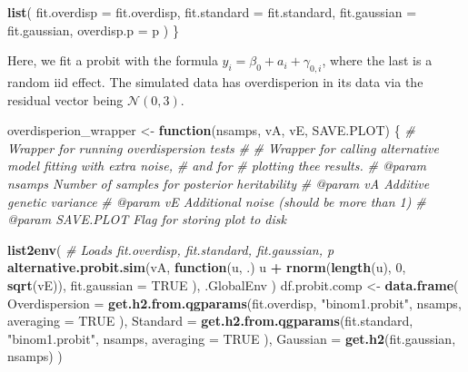 \documentclass[
]{article}
\newenvironment{Shaded}{\begin{snugshade}}{\end{snugshade}}
\newcommand{\AttributeTok}[1]{\textcolor[rgb]{0.13,0.29,0.53}{#1}}
\newcommand{\CommentTok}[1]{\textcolor[rgb]{0.56,0.35,0.01}{\textit{#1}}}
\newcommand{\ConstantTok}[1]{\textcolor[rgb]{0.56,0.35,0.01}{#1}}
\newcommand{\ControlFlowTok}[1]{\textcolor[rgb]{0.13,0.29,0.53}{\textbf{#1}}}
\newcommand{\DecValTok}[1]{\textcolor[rgb]{0.00,0.00,0.81}{#1}}
\newcommand{\FunctionTok}[1]{\textcolor[rgb]{0.13,0.29,0.53}{\textbf{#1}}}
\newcommand{\NormalTok}[1]{#1}
\newcommand{\OtherTok}[1]{\textcolor[rgb]{0.56,0.35,0.01}{#1}}
\newcommand{\SpecialCharTok}[1]{\textcolor[rgb]{0.81,0.36,0.00}{\textbf{#1}}}
\newcommand{\StringTok}[1]{\textcolor[rgb]{0.31,0.60,0.02}{#1}}
\begin{document}
\begin{Shaded}
\begin{Highlighting}[]
  \FunctionTok{list}\NormalTok{(}
    \AttributeTok{fit.overdisp =}\NormalTok{ fit.overdisp,}
    \AttributeTok{fit.standard =}\NormalTok{ fit.standard,}
    \AttributeTok{fit.gaussian =}\NormalTok{ fit.gaussian,}
    \AttributeTok{overdisp.p =}\NormalTok{ p}
\NormalTok{  )}
\NormalTok{\}}
\end{Highlighting}
\end{Shaded}

Here, we fit a probit with the formula
\(y_i = \beta_0 + a_i + \gamma_{0,i}\), where the last is a random iid
effect. The simulated data has overdisperion in its data via the
residual vector being \(\mathcal N(0,3)\).

\begin{Shaded}
\begin{Highlighting}[]
\NormalTok{overdisperion\_wrapper }\OtherTok{\textless{}{-}} \ControlFlowTok{function}\NormalTok{(nsamps, vA, vE, SAVE.PLOT) \{}
  \CommentTok{\#\textquotesingle{} Wrapper for running overdispersion tests}
  \CommentTok{\#\textquotesingle{}}
  \CommentTok{\#\textquotesingle{} Wrapper for calling alternative model fitting with extra noise,}
  \CommentTok{\#\textquotesingle{} and for}
  \CommentTok{\#\textquotesingle{} plotting thee results.}
  \CommentTok{\#\textquotesingle{} @param nsamps Number of samples for posterior heritability}
  \CommentTok{\#\textquotesingle{} @param vA Additive genetic variance}
  \CommentTok{\#\textquotesingle{} @param vE Additional noise (should be more than 1)}
  \CommentTok{\#\textquotesingle{} @param SAVE.PLOT Flag for storing plot to disk}

  \FunctionTok{list2env}\NormalTok{( }\CommentTok{\# Loads fit.overdisp, fit.standard, fit.gaussian, p}
    \FunctionTok{alternative.probit.sim}\NormalTok{(vA, }\ControlFlowTok{function}\NormalTok{(u, .) u }\SpecialCharTok{+} \FunctionTok{rnorm}\NormalTok{(}\FunctionTok{length}\NormalTok{(u),}
                                                        \DecValTok{0}\NormalTok{, }\FunctionTok{sqrt}\NormalTok{(vE)),}
      \AttributeTok{fit.gaussian =} \ConstantTok{TRUE}
\NormalTok{    ), .GlobalEnv}
\NormalTok{  )}
\NormalTok{  df.probit.comp }\OtherTok{\textless{}{-}} \FunctionTok{data.frame}\NormalTok{(}
    \AttributeTok{Overdispersion =} \FunctionTok{get.h2.from.qgparams}\NormalTok{(fit.overdisp,}
                                          \StringTok{"binom1.probit"}\NormalTok{,}
\NormalTok{      nsamps,}
      \AttributeTok{averaging =} \ConstantTok{TRUE}
\NormalTok{    ),}
    \AttributeTok{Standard =} \FunctionTok{get.h2.from.qgparams}\NormalTok{(fit.standard, }\StringTok{"binom1.probit"}\NormalTok{,}
\NormalTok{      nsamps,}
      \AttributeTok{averaging =} \ConstantTok{TRUE}
\NormalTok{    ),}
    \AttributeTok{Gaussian =} \FunctionTok{get.h2}\NormalTok{(fit.gaussian, nsamps)}
\NormalTok{  )}


\end{Highlighting}
\end{Shaded}
\end{document}
